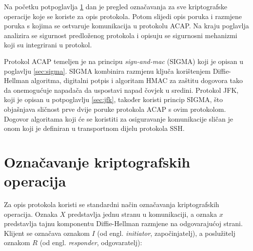 Na početku potpoglavlja \ref{sec:oznac} dan je pregled označavanja za sve
kriptografske operacije
koje se koriste za opis protokola. Potom slijedi opis poruka i razmjene poruka s
kojima se ostvaruje komunikacija u protokolu ACAP. Na kraju poglavlja
analizira se sigurnost predloženog protokola i opisuju se sigurnosni mehanizmi
koji su integrirani u protokol.

Protokol ACAP temeljen je na principu \emph{sign-and-mac} (SIGMA) koji je
opisan u poglavlju \ref{sec:sigma}. SIGMA kombinira razmjenu
ključa korištenjem Diffie-Hellman algoritma, digitalni potpis i algoritam HMAC
za zaštitu dogovora tako da
onemogućuje napadača da uspostavi napad čovjek u sredini. Protokol JFK, koji
je opisan u potpoglavlju \ref{sec:jfk}, također koristi princip SIGMA, što
objašnjava sličnost prve dvije poruke protokola ACAP s ovim protokolom. Dogovor
algoritama koji će se koristiti za osiguravanje komunikacije sličan je onom
koji je definiran u transportnom dijelu protokola SSH.

\section{Označavanje kriptografskih operacija}
\label{sec:oznac}

Za opis protokola koristi se standardni način označavanja kriptografskih
operacija. Oznaka $X$
predstavlja jednu stranu u komunikaciji, a oznaka $x$ predstavlja tajnu
komponentu Diffie-Hellman razmjene na odgovarajućoj strani. Klijent se označava
oznakom $I$ (od
engl. \emph{initiator}, započinjatelj), a poslužitelj oznakom $R$ (od
engl. \emph{responder}, odgovaratelj):

